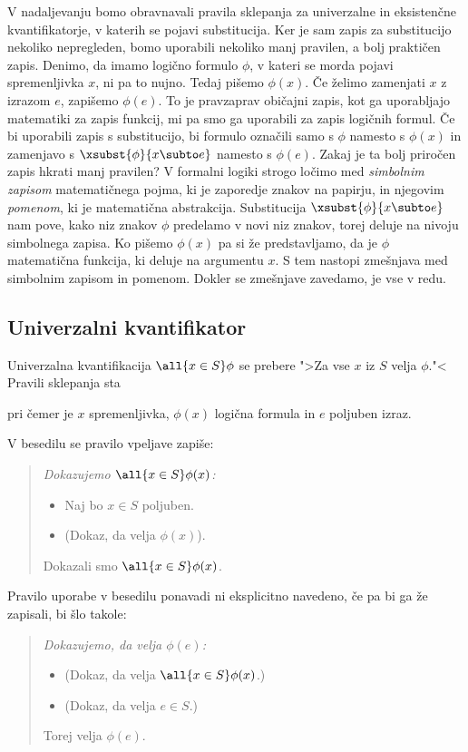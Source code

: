V nadaljevanju bomo obravnavali pravila sklepanja za univerzalne in
eksistenčne kvantifikatorje, v katerih se pojavi substitucija. Ker je
sam zapis za substitucijo nekoliko nepregleden, bomo uporabili
nekoliko manj pravilen, a bolj praktičen zapis. Denimo, da imamo
logično formulo $\phi$, v kateri se morda pojavi spremenljivka $x$, ni
pa to nujno. Tedaj pišemo $\phi(x)$. Če želimo zamenjati $x$ z izrazom
$e$, zapišemo $\phi(e)$. To je pravzaprav običajni zapis, kot ga
uporabljajo matematiki za zapis funkcij, mi pa smo ga uporabili za
zapis logičnih formul. Če bi uporabili zapis s substitucijo, bi
formulo označili samo s $\phi$ namesto s $\phi(x)$ in zamenjavo s
$\xsubst{\phi}{x \subto e}$ namesto s $\phi(e)$. Zakaj je ta bolj
priročen zapis hkrati manj pravilen? V formalni logiki strogo ločimo
med \emph{simbolnim zapisom} matematičnega pojma, ki je zaporedje
znakov na papirju, in njegovim \emph{pomenom}, ki je matematična
abstrakcija. Substitucija $\xsubst{\phi}{x \subto e}$ nam pove, kako
niz znakov $\phi$ predelamo v novi niz znakov, torej deluje na nivoju
simbolnega zapisa. Ko pišemo $\phi(x)$ pa si že predstavljamo, da je
$\phi$ matematična funkcija, ki deluje na argumentu $x$. S tem nastopi
zmešnjava med simbolnim zapisom in pomenom. Dokler se zmešnjave
zavedamo, je vse v redu.

\subsection{Univerzalni kvantifikator}
\label{sec:univerzalni-kvantifikator}

Univerzalna kvantifikacija $\all{x \in S} \phi$ se prebere ">Za vse $x$
iz $S$ velja $\phi$."< Pravili sklepanja sta
%
%
pri čemer je $x$ spremenljivka, $\phi(x)$ logična formula in $e$ poljuben izraz.

V besedilu se pravilo vpeljave zapiše:
%
\begin{quote}
  \it
  Dokazujemo $\all{x \in S} \phi(x)$:
  \begin{itemize}
  \item[] Naj bo $x \in S$ poljuben.
  \item[] (Dokaz, da velja $\phi(x)$).
  \end{itemize}
  Dokazali smo $\all{x \in S} \phi(x)$.
\end{quote}
%
Pravilo uporabe v besedilu ponavadi ni eksplicitno navedeno, če pa bi
ga že zapisali, bi šlo takole:
%
\begin{quote}
  \it
  Dokazujemo, da velja $\phi(e)$:
  \begin{itemize}
  \item[] (Dokaz, da velja $\all{x \in S} \phi(x)$.)
  \item[] (Dokaz, da velja $e \in S$.)
  \end{itemize}
  Torej velja $\phi(e)$.
\end{quote}


